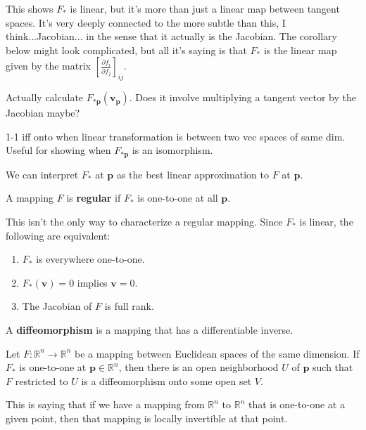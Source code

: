 \documentclass[twoside,10pt]{report}
\begin{document}
This shows $F_*$ is linear, but it's more than just a linear map between tangent spaces. It's very deeply connected to the {\color{red}more subtle than this, I think...}Jacobian... in the sense that it actually is the Jacobian. The corollary below might look complicated, but all it's saying is that $F_*$ is the linear map given by the matrix $[\frac{\partial f_i}{\partial f_j} ]_{ij}.$

{\color{red}Actually calculate $F_{*\mathbf{p}}(\mathbf{v}_{\mathbf{p}})$. Does it involve multiplying a tangent vector by the Jacobian maybe?}

{\color{red}1-1 iff onto when linear transformation is between two vec spaces of same dim. Useful for showing when $F_{*\mathbf{p}}$ is an isomorphism.}

\begin{note}
We can interpret $F_*$ at $\mathbf{p}$ as the best linear approximation to $F$ at $\mathbf{p}$.
\end{note}

\begin{defn}[]
A mapping $F$ is \textbf{regular} if $F_*$ is one-to-one at all $\mathbf{p}$.
\end{defn}

This isn't the only way to characterize a regular mapping. Since $F_*$ is linear, the following are equivalent:
\begin{enumerate}
	\item $F_*$ is everywhere one-to-one.
	\item $F_*(\mathbf{v}) = 0$ implies $\mathbf{v}=0.$ 
	\item The Jacobian of $F$ is full rank.
\end{enumerate}

\begin{defn}[]
	A \textbf{diffeomorphism} is a mapping that has a differentiable inverse.
\end{defn}

\begin{thrm}
Let $F:\mathbb{R}^n\to \mathbb{R}^n$ be a mapping between Euclidean spaces of the same dimension. If $F_*$ is one-to-one at $\mathbf{p}\in \mathbb{R}^n$, then there is an open neighborhood $U$ of $\mathbf{p}$ such that $F$ restricted to $U$ is a diffeomorphism onto some open set $V$.
\end{thrm}

This is saying that if we have a mapping from $\mathbb{R}^n$ to $\mathbb{R}^n$ that is one-to-one at a given point, then that mapping is locally invertible at that point.
\end{document}
